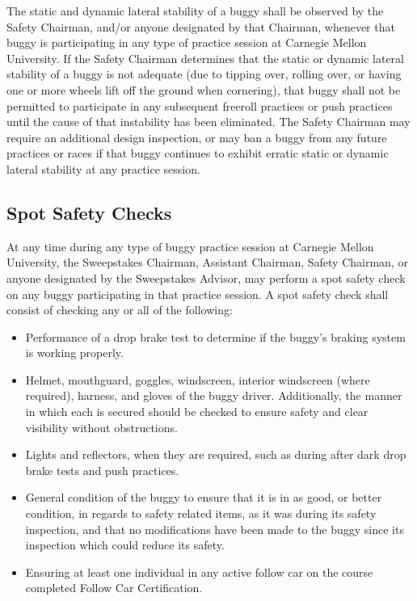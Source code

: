 \begin{itemize}
		The static and dynamic lateral stability of a buggy shall be observed by the
		Safety Chairman, and/or anyone designated by that Chairman, whenever that buggy
		is participating in any type of practice session at Carnegie Mellon University.
		If the Safety Chairman determines that the static or dynamic lateral stability
		of a buggy is not adequate (due to tipping over, rolling over, or having one or
		more wheels lift off the ground when cornering), that buggy shall not be
		permitted to participate in any subsequent freeroll practices or push practices
		until the cause of that instability has been eliminated. The Safety Chairman
		may require an additional design inspection, or may ban a buggy from any future
		practices or races if that buggy continues to exhibit erratic static or dynamic
		lateral stability at any practice session.

	\end{itemize}

\subsection{Spot Safety Checks}

	At any time during any type of buggy practice session at Carnegie Mellon
	University, the Sweepstakes Chairman, Assistant Chairman, Safety Chairman, or
	anyone designated by the Sweepstakes Advisor, may perform a spot safety check
	on any buggy participating in that practice session. A spot safety check shall
	consist of checking any or all of the following:

	\begin{itemize}

		\item Performance of a drop brake test to determine if the buggy's braking
		system is working properly.

		\item Helmet, mouthguard, goggles, windscreen, interior windscreen (where required), 
		harness, and gloves of the buggy driver. Additionally, the manner in which each is 
		secured should be checked to ensure safety and clear visibility without 
		obstructions.

		\item Lights and reflectors, when they are required,
		such as during after dark drop brake tests and push practices.

		\item General condition of the buggy to ensure that it is in as
		good, or better condition, in regards to safety related items, as it was during
		its safety inspection, and that no modifications have been made to the buggy
		since its inspection which could reduce its safety.
		
		\item Ensuring at least one individual in any active follow car on the course 
		completed Follow Car Certification.

	\end{itemize}

